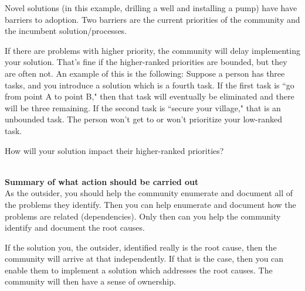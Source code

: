 Novel solutions (in this example, drilling a well and installing a pump) have have barriers to adoption. Two barriers are the current priorities of the community and the incumbent solution/processes.

If there are problems with higher priority, the community will delay implementing your solution. That's fine if the higher-ranked priorities are bounded, but they are often not. An example of this is the following:
Suppose a person has three tasks, and you introduce a solution which is a fourth task.
If the first task is ``go from point A to point B," then that task will eventually be eliminated and there will be three remaining.
If the second task is ``secure your village," that is an unbounded task. The person won't get to or won't prioritize your low-ranked task.

How will your solution impact their higher-ranked priorities?

\ \\

\textbf{Summary of what action should be carried out} \\

As the outsider, you should help the community enumerate and document all of the problems they identify. Then you can help enumerate and document how the problems are related (dependencies). Only then can you help the community identify and document the root causes.

If the solution you, the outsider, identified really is the root cause, then the community will arrive at that independently. If that is the case, then you can enable them to implement a solution which addresses the root causes. The community will then have a sense of ownership.
